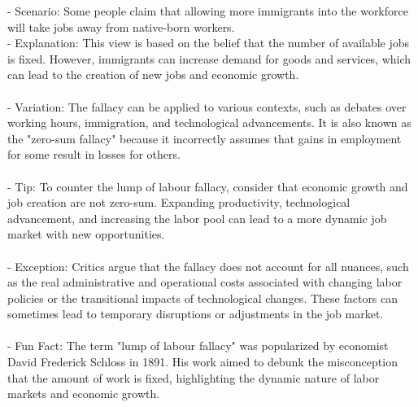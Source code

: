 \documentclass[a4paper,12pt,single,pdftex]{scrbook}
\begin{document}
    
        - Scenario: Some people claim that allowing more immigrants into the workforce will take jobs away from native-born workers.
    \\

    
        - Explanation: This view is based on the belief that the number of available jobs is fixed. However, immigrants can increase demand for goods and services, which can lead to the creation of new jobs and economic growth.
    \\

    
      
    \\

    
      - Variation: The fallacy can be applied to various contexts, such as debates over working hours, immigration, and technological advancements. It is also known as the "zero-sum fallacy" because it incorrectly assumes that gains in employment for some result in losses for others.
    \\

    
      
    \\

    
      - Tip: To counter the lump of labour fallacy, consider that economic growth and job creation are not zero-sum. Expanding productivity, technological advancement, and increasing the labor pool can lead to a more dynamic job market with new opportunities.
    \\

    
      
    \\

    
      - Exception: Critics argue that the fallacy does not account for all nuances, such as the real administrative and operational costs associated with changing labor policies or the transitional impacts of technological changes. These factors can sometimes lead to temporary disruptions or adjustments in the job market.
    \\

    
      
    \\

    
      - Fun Fact: The term "lump of labour fallacy" was popularized by economist David Frederick Schloss in 1891. His work aimed to debunk the misconception that the amount of work is fixed, highlighting the dynamic nature of labor markets and economic growth.
    \\
\end{document}
